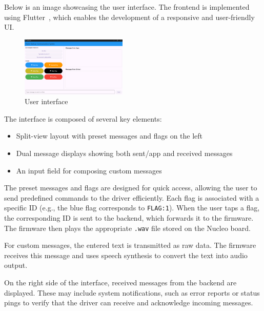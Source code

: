 Below is an image showcasing the user interface. The frontend is implemented using Flutter~\cite{flutter}, which enables the development of a responsive and user-friendly UI.

\begin{figure}[H]
\centering
\includegraphics[width=0.45\textwidth]{images/frontend-design.png}
\caption{User interface}\label{fig:frontend-design}
\end{figure}

The interface is composed of several key elements:

\begin{itemize}
    \item Split-view layout with preset messages and flags on the left
    \item Dual message displays showing both sent/app and received messages
    \item An input field for composing custom messages
\end{itemize}

The preset messages and flags are designed for quick access, allowing the user to send predefined commands to the driver efficiently. 
Each flag is associated with a specific ID (e.g., the blue flag corresponds to \texttt{FLAG:1}). 
When the user taps a flag, the corresponding ID is sent to the backend, which forwards it to the firmware. 
The firmware then plays the appropriate \texttt{.wav} file stored on the Nucleo board.

For custom messages, the entered text is transmitted as raw data. 
The firmware receives this message and uses speech synthesis to convert the text into audio output.

On the right side of the interface, received messages from the backend are displayed. 
These may include system notifications, such as error reports or status pings to verify that the driver can receive and acknowledge incoming messages.
